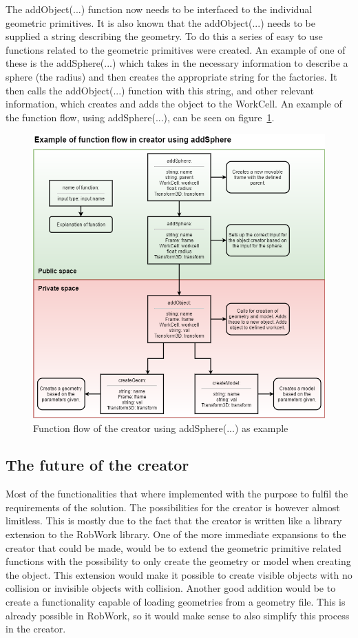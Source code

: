 The addObject(...) function now needs to be interfaced to the individual geometric primitives. It is also known that the addObject(...) needs to be supplied a string describing the geometry. To do this a series of easy to use functions related to the geometric primitives were created. An example of one of these is the addSphere(...) which takes in the necessary information to describe a sphere (the radius) and then creates the appropriate string for the factories. It then calls the addObject(...) function with this string, and other relevant information, which creates and adds the object to the WorkCell. An example of the function flow, using addSphere(...), can be seen on figure~\ref{fig:CreatorFlow}.

\begin{figure}[h]
	\centering
	\includegraphics[scale=0.55]{Figures/CreatorFlow.png}
	\caption{Function flow of the creator using addSphere(...) as example}
	\label{fig:CreatorFlow}
\end{figure}

\subsection{The future of the creator}
Most of the functionalities that where implemented with the purpose to fulfil the requirements of the solution. The possibilities for the creator is however almost limitless. This is mostly due to the fact that the creator is written like a library extension to the RobWork library. One of the more immediate expansions to the creator that could be made, would be to extend the geometric primitive related functions with the possibility to only create the geometry or model when creating the object. This extension would make it possible to create visible objects with no collision or invisible objects with collision. Another good addition would be to create a functionality capable of loading geometries from a geometry file. This is already possible in RobWork, so it would make sense to also simplify this process in the creator.